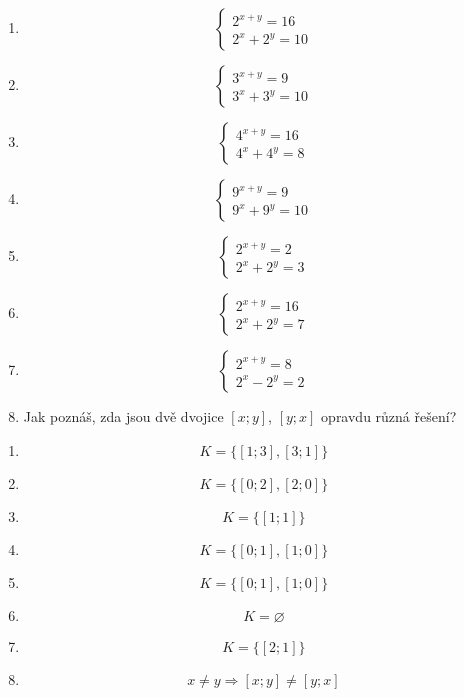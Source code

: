 \documentclass[11pt,a4paper]{article}
\begin{document}
\begin{zadaniReseniBox}[title={Samostatná práce 1}]
\begin{enumerate}[label=\alph*)]
\item \[\begin{cases}2^{x+y}=16\\2^x+2^y=10\end{cases}\]
\item \[\begin{cases}3^{x+y}=9\\3^x+3^y=10\end{cases}\]
\item \[
\begin{cases}4^{x+y}=16\\4^x+4^y=8\end{cases}
\]
\item \[\begin{cases}9^{x+y}=9\\9^x+9^y=10\end{cases}\]
\item \[
\begin{cases}2^{x+y}=2\\2^x+2^y=3\end{cases}
\]
\item \[\begin{cases}2^{x+y}=16\\2^x+2^y=7\end{cases}\]
\item \[
\begin{cases}2^{x+y}=8\\2^x-2^y=2\end{cases}
\]
\item Jak poznáš, zda jsou dvě dvojice $[x;y]$, $[y;x]$ opravdu různá řešení?
\end{enumerate}
\tcblower
\begin{enumerate}[label=\alph*)]
\item \[K=\{[1;3],[3;1]\}\]
\item \[K=\{[0;2],[2;0]\}\]
\item \[
K=\{[1;1]\}
\]
\item \[K=\{[0;1],[1;0]\}\]
\item \[
K=\{[0;1],[1;0]\}
\]
\item \[K=\varnothing\]
\item \[
K=\{[2;1]\}
\]
\item \[
x\ne y\Rightarrow [x;y]\ne[y;x]
\]
\end{enumerate}
\end{zadaniReseniBox}
\end{document}
